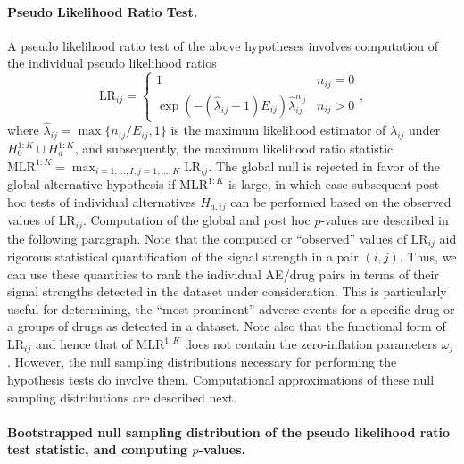 \hypertarget{pseudo-likelihood-ratio-test.}{%
\paragraph{Pseudo Likelihood Ratio Test.}\label{pseudo-likelihood-ratio-test.}}

A pseudo likelihood ratio test of the above hypotheses involves computation of the individual pseudo likelihood ratios \begin{equation*}
{\text{LR}}_{i j} =
\begin{cases}
1 & n_{i j} = 0 \\
\exp(-(\hat \lambda_{i j}-1) E_{i j}) \hat \lambda_{i j}^{n_{i j}} & n_{i j} > 0
\end{cases},
\end{equation*} where \(\hat \lambda_{i j} = \max\{n_{i j}/E_{i j}, 1\}\) is the maximum likelihood estimator of \(\lambda_{i j}\) under \(H_0^{1:K} \cup H_a^{1:K}\), and subsequently, the maximum likelihood ratio statistic \(\text{MLR}^{1:K} = \max_{i = 1, \dots, I; j = 1, \dots, K} \text{LR}_{i j}\). The global null is rejected in favor of the global alternative hypothesis if \(\text{MLR}^{1:K}\) is large, in which case subsequent post hoc tests of individual alternatives \(H_{a, i j}\) can be performed based on the observed values of \({\text{LR}}_{i j}\). Computation of the global and post hoc \(p\)-values are described in the following paragraph. Note that the computed or ``observed'' values of \({\text{LR}}_{i j}\) aid rigorous statistical quantification of the signal strength in a pair \((i, j)\). Thus, we can use these quantities to rank the individual AE/drug pairs in terms of their signal strengths detected in the dataset under consideration. This is particularly useful for determining, the ``most prominent'' adverse events for a specific drug or a groups of drugs as detected in a dataset. Note also that the functional form of \(\text{LR}_{i j}\) and hence that of \(\text{MLR}^{1:K}\) does not contain the zero-inflation parameters \({\omega_j}\). However, the null sampling distributions necessary for performing the hypothesis tests do involve them. Computational approximations of these null sampling distributions are described next.

\hypertarget{bootstrapped-null-sampling-distribution-of-the-pseudo-likelihood-ratio-test-statistic-and-computing-p-values.}{%
\paragraph{\texorpdfstring{Bootstrapped null sampling distribution of the pseudo likelihood ratio test statistic, and computing \(p\)-values.}{Bootstrapped null sampling distribution of the pseudo likelihood ratio test statistic, and computing p-values.}}\label{bootstrapped-null-sampling-distribution-of-the-pseudo-likelihood-ratio-test-statistic-and-computing-p-values.}}

